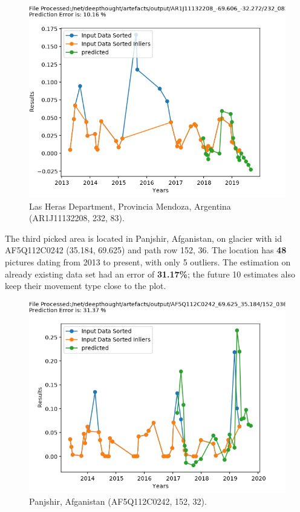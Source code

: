 \documentclass[12pt, a4paper]{report}
\begin{document}
	\begin{figure}[H]
		\centering
		\includegraphics[scale=0.4]{10.png}
		\caption{Las Heras Department, Provincia Mendoza, Argentina (AR1J11132208, 232, 83).}
		\label{fig:three}
	\end{figure}
	
	The third picked area is located in Panjshir, Afganistan, on glacier with id AF5Q112C0242 (35.184, 69.625) and path row 152, 36. The location has \textbf{48} pictures dating from 2013 to present, with only 5 outliers. The estimation on already existing data set had an error of \textbf{31.17\%}; the future 10 estimates also keep their movement type close to the plot.
	
	\begin{figure}[H]
		\centering
		\includegraphics[scale=0.4]{31.png}
		\caption{Panjshir, Afganistan (AF5Q112C0242, 152, 32).}
		\label{fig:three}
	\end{figure}
\end{document}
